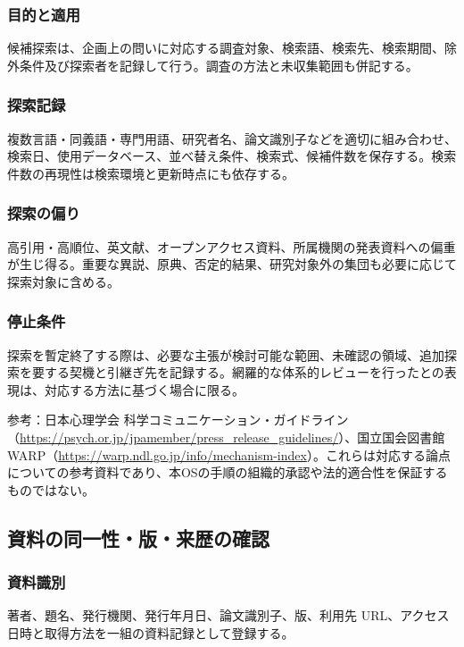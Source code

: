 \documentclass[a4paper,11pt]{article}
\begin{document}
\subsubsection{目的と適用}
\par 候補探索は、企画上の問いに対応する調査対象、検索語、検索先、検索期間、除外条件及び探索者を記録して行う。調査の方法と未収集範囲も併記する。\par\medskip
\subsubsection{探索記録}
\par 複数言語・同義語・専門用語、研究者名、論文識別子などを適切に組み合わせ、検索日、使用データベース、並べ替え条件、検索式、候補件数を保存する。検索件数の再現性は検索環境と更新時点にも依存する。\par\medskip
\subsubsection{探索の偏り}
\par 高引用・高順位、英文献、オープンアクセス資料、所属機関の発表資料への偏重が生じ得る。重要な異説、原典、否定的結果、研究対象外の集団も必要に応じて探索対象に含める。\par\medskip
\subsubsection{停止条件}
\par 探索を暫定終了する際は、必要な主張が検討可能な範囲、未確認の領域、追加探索を要する契機と引継ぎ先を記録する。網羅的な体系的レビューを行ったとの表現は、対応する方法に基づく場合に限る。\par\medskip
\par 参考：日本心理学会 科学コミュニケーション・ガイドライン（\url{https://psych.or.jp/jpamember/press_release_guidelines/}）、国立国会図書館 WARP（\url{https://warp.ndl.go.jp/info/mechanism-index}）。これらは対応する論点についての参考資料であり、本OSの手順の組織的承認や法的適合性を保証するものではない。\par\medskip
\subsection{資料の同一性・版・来歴の確認}
\subsubsection{資料識別}
\par 著者、題名、発行機関、発行年月日、論文識別子、版、利用先 URL、アクセス日時と取得方法を一組の資料記録として登録する。\par\medskip
\end{document}
